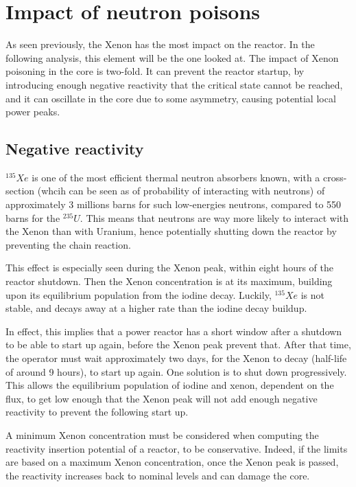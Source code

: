 \section{Impact of neutron poisons}

As seen previously, the Xenon has the most impact on the reactor. In the following analysis, this element will be the one looked at. The impact of Xenon poisoning in the core is two-fold. It can prevent the reactor startup, by introducing enough negative reactivity that the critical state cannot be reached, and it can oscillate in the core due to some asymmetry, causing potential local power peaks.

\subsection{Negative reactivity}

$^{135}Xe$ is one of the most efficient thermal neutron absorbers known, with a cross-section (whcih can be seen as of probability of interacting with neutrons) of approximately 3 millions barns for such low-energies neutrons, compared to 550 barns for the $^{235}U$. This means that neutrons are way more likely to interact with the Xenon than with Uranium, hence potentially shutting down the reactor by preventing the chain reaction.

This effect is especially seen during the Xenon peak, within eight hours of the reactor shutdown. Then the Xenon concentration is at its maximum, building upon its equilibrium population from the iodine decay. Luckily, $^{135}Xe$ is not stable, and decays away at a higher rate than the iodine decay buildup.

In effect, this implies that a power reactor has a short window after a shutdown to be able to start up again, before the Xenon peak prevent that. After that time, the operator must wait approximately two days, for the Xenon to decay (half-life of around 9 hours), to start up again. One solution is to shut down progressively. This allows the equilibrium population of iodine and xenon, dependent on the flux, to get low enough that the Xenon peak will not add enough negative reactivity to prevent the following start up.

A minimum Xenon concentration must be considered when computing the reactivity insertion potential of a reactor, to be conservative. Indeed, if the limits are based on a maximum Xenon concentration, once the Xenon peak is passed, the reactivity increases back to nominal levels and can damage the core.

